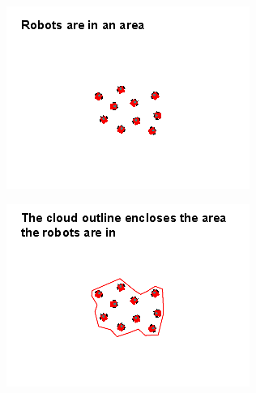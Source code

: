\begin{figure}
	\centering
	\begin{subfigure}{0.3\textwidth}
		\includegraphics[width=\linewidth]{../ui_experiment/slide_images/Swarm_Robot_Control_-_Unknown_Number_of_Robots_0001.png}
	\end{subfigure}
	\begin{subfigure}{0.3\textwidth}
		\includegraphics[width=\linewidth]{../ui_experiment/slide_images/Swarm_Robot_Control_-_Unknown_Number_of_Robots_0002.png}
	\end{subfigure}
	\begin{subfigure}{0.3\textwidth}

\end{subfigure}
\end{figure}
